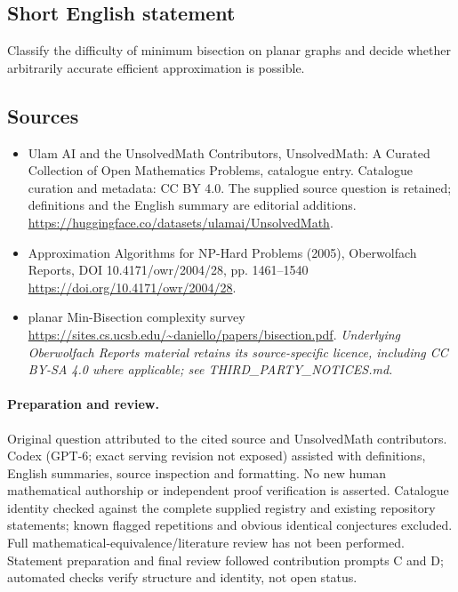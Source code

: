 \documentclass[11pt]{article}
\begin{document}
\subsection{Short English statement}
Classify the difficulty of minimum bisection on planar graphs and decide whether arbitrarily accurate efficient approximation is possible.
\subsection{Sources}
\begin{itemize}
\item[\hypertarget{source:statement:1}{S1}] Ulam AI and the UnsolvedMath Contributors, UnsolvedMath: A Curated Collection of Open Mathematics Problems, catalogue entry. Catalogue curation and metadata: CC BY 4.0. The supplied source question is retained; definitions and the English summary are editorial additions.
\url{https://huggingface.co/datasets/ulamai/UnsolvedMath}.
\item[\hypertarget{source:statement:2}{S2}] Approximation Algorithms for NP-Hard Problems (2005), Oberwolfach Reports, DOI 10.4171/owr/2004/28, pp. 1461--1540
\url{https://doi.org/10.4171/owr/2004/28}.
\item[\hypertarget{source:statement:3}{S3}] planar Min-Bisection complexity survey
\url{https://sites.cs.ucsb.edu/~daniello/papers/bisection.pdf}.
\textit{Underlying Oberwolfach Reports material retains its source-specific licence, including CC BY-SA 4.0 where applicable; see THIRD\_PARTY\_NOTICES.md.}
\end{itemize}
\paragraph{Preparation and review.}
Original question attributed to the cited source and UnsolvedMath contributors. Codex (GPT-6; exact serving revision not exposed) assisted with definitions, English summaries, source inspection and formatting. No new human mathematical authorship or independent proof verification is asserted. Catalogue identity checked against the complete supplied registry and existing repository statements; known flagged repetitions and obvious identical conjectures excluded. Full mathematical-equivalence/literature review has not been performed. Statement preparation and final review followed contribution prompts C and D; automated checks verify structure and identity, not open status.
\label{end:statement}
\end{document}
